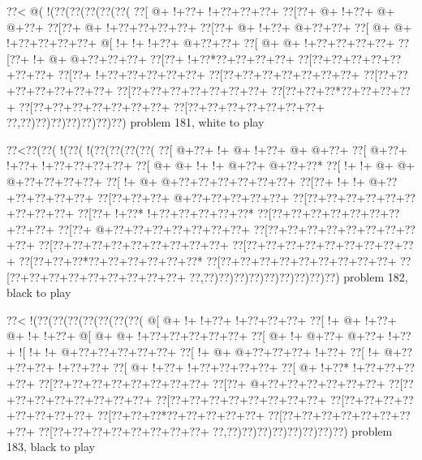 \vbox{\vbox{\goo
\0??<\- @(\- !(\0??(\0??(\0??(\0??(\0??(
\0??[\- @+\- !+\0??+\- !+\0??+\0??+\0??+
\0??[\0??+\- @+\- !+\0??+\- @+\- @+\0??+
\0??[\0??+\- @+\- !+\0??+\0??+\0??+\0??+
\0??[\0??+\- @+\- !+\0??+\- @+\0??+\0??+
\0??[\- @+\- @+\- !+\0??+\0??+\0??+\0??+
\- @[\- !+\- !+\- !+\0??+\- @+\0??+\0??+
\0??[\- @+\- @+\- !+\0??+\0??+\0??+\0??+
\0??[\0??+\- !+\- @+\- @+\0??+\0??+\0??+
\0??[\0??+\- !+\0??*\0??+\0??+\0??+\0??+
\0??[\0??+\0??+\0??+\0??+\0??+\0??+\0??+
\0??[\0??+\- !+\0??+\0??+\0??+\0??+\0??+
\0??[\0??+\0??+\0??+\0??+\0??+\0??+\0??+
\0??[\0??+\0??+\0??+\0??+\0??+\0??+\0??+
\0??[\0??+\0??+\0??+\0??+\0??+\0??+\0??+
\0??[\0??+\0??+\0??*\0??+\0??+\0??+\0??+
\0??[\0??+\0??+\0??+\0??+\0??+\0??+\0??+
\0??[\0??+\0??+\0??+\0??+\0??+\0??+\0??+
\0??,\0??)\0??)\0??)\0??)\0??)\0??)\0??)
}
\hfil problem 181, white to play\hfil\break
}

\vbox{\vbox{\goo
\0??<\0??(\0??(\- !(\0??(\- !(\0??(\0??(\0??(\0??(
\0??[\- @+\0??+\- !+\- @+\- !+\0??+\- @+\- @+\0??+
\0??[\- @+\0??+\- !+\0??+\- !+\0??+\0??+\0??+\0??+
\0??[\- @+\- @+\- !+\- !+\- @+\0??+\- @+\0??+\0??*
\0??[\- !+\- !+\- @+\- @+\- @+\0??+\0??+\0??+\0??+
\0??[\- !+\- @+\- @+\0??+\0??+\0??+\0??+\0??+\0??+
\0??[\0??+\- !+\- !+\- @+\0??+\0??+\0??+\0??+\0??+
\0??[\0??+\0??+\0??+\- @+\0??+\0??+\0??+\0??+\0??+
\0??[\0??+\0??+\0??+\0??+\0??+\0??+\0??+\0??+\0??+
\0??[\0??+\- !+\0??*\- !+\0??+\0??+\0??+\0??+\0??*
\0??[\0??+\0??+\0??+\0??+\0??+\0??+\0??+\0??+\0??+
\0??[\0??+\- @+\0??+\0??+\0??+\0??+\0??+\0??+\0??+
\0??[\0??+\0??+\0??+\0??+\0??+\0??+\0??+\0??+\0??+
\0??[\0??+\0??+\0??+\0??+\0??+\0??+\0??+\0??+\0??+
\0??[\0??+\0??+\0??+\0??+\0??+\0??+\0??+\0??+\0??+
\0??[\0??+\0??+\0??*\0??+\0??+\0??+\0??+\0??+\0??*
\0??[\0??+\0??+\0??+\0??+\0??+\0??+\0??+\0??+\0??+
\0??[\0??+\0??+\0??+\0??+\0??+\0??+\0??+\0??+\0??+
\0??,\0??)\0??)\0??)\0??)\0??)\0??)\0??)\0??)\0??)
}
\hfil problem 182, black to play\hfil\break
}

\vbox{\vbox{\goo
\0??<\- !(\0??(\0??(\0??(\0??(\0??(\0??(\0??(
\- @[\- @+\- !+\- !+\0??+\- !+\0??+\0??+\0??+
\0??[\- !+\- @+\- !+\0??+\- @+\- !+\- !+\0??+
\- @[\- @+\- @+\- !+\0??+\0??+\0??+\0??+\0??+
\0??[\- @+\- !+\- @+\0??+\- @+\0??+\- !+\0??+
\- ![\- !+\- !+\- @+\0??+\0??+\0??+\0??+\0??+
\0??[\- !+\- @+\- @+\0??+\0??+\0??+\- !+\0??+
\0??[\- !+\- @+\0??+\0??+\0??+\- !+\0??+\0??+
\0??[\- @+\- !+\0??+\- !+\0??+\0??+\0??+\0??+
\0??[\- @+\- !+\0??*\- !+\0??+\0??+\0??+\0??+
\0??[\0??+\0??+\0??+\0??+\0??+\0??+\0??+\0??+
\0??[\0??+\- @+\0??+\0??+\0??+\0??+\0??+\0??+
\0??[\0??+\0??+\0??+\0??+\0??+\0??+\0??+\0??+
\0??[\0??+\0??+\0??+\0??+\0??+\0??+\0??+\0??+
\0??[\0??+\0??+\0??+\0??+\0??+\0??+\0??+\0??+
\0??[\0??+\0??+\0??*\0??+\0??+\0??+\0??+\0??+
\0??[\0??+\0??+\0??+\0??+\0??+\0??+\0??+\0??+
\0??[\0??+\0??+\0??+\0??+\0??+\0??+\0??+\0??+
\0??,\0??)\0??)\0??)\0??)\0??)\0??)\0??)\0??)
}
\hfil problem 183, black to play\hfil\break
}

